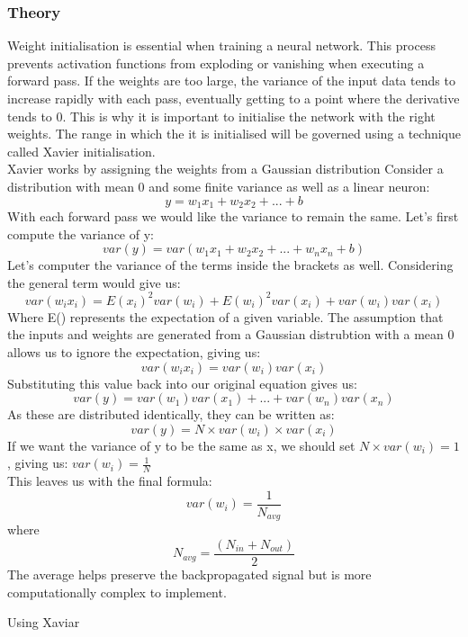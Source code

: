 \documentclass{article}
\begin{document}
\subsubsection{Theory}
Weight initialisation is essential when training a neural network. This process prevents
activation functions from exploding or vanishing when executing a forward pass. If the weights are too large, the variance of the input data tends to increase rapidly with each pass, eventually
getting to a point where the derivative tends to 0. This is why it is important to initialise the network with the right weights. The range in which the it is initialised will be governed using a technique called Xavier initialisation.\\
Xavier works by assigning the weights from a Gaussian distribution
Consider a distribution with mean 0 and some finite variance as well as a linear neuron: $$y = w_1x_1 + w_2x_2 + ... + b$$
With each forward pass we would like the variance to remain the same.
Let's first compute the variance of y:
$$var(y) = var(w_1x_1 + w_2x_2 + ...+w_nx_n + b)$$
Let's computer the variance of the terms inside the brackets as well. Considering the general term would give us:
$$var(w_ix_i) = E(x_i)^2var(w_i) + E(w_i)^2var(x_i) + var(w_i)var(x_i)$$
Where E() represents the expectation of a given variable. The assumption that the inputs and weights are generated from a Gaussian distrubtion with a mean 0 allows us to ignore the
expectation, giving us:
$$var(w_ix_i) = var(w_i)var(x_i) $$
Substituting this value back into our original equation gives us:
$$var(y) = var(w_1)var(x_1)+ ... + var(w_n)var(x_n)$$
As these are distributed identically, they can be written as:
$$var(y) = N \times var(w_i) \times var(x_i)$$
If we want the variance of y to be the same as x, we should set $N\times var(w_i) = 1$, giving us:
$var(w_i) = \frac{1}{N}$
\\This leaves us with the final formula:
$$var(w_i) = \frac{1}{N_{avg}}$$
where $$N_{avg} = \frac{(N_{in} + N_{out})}{2}$$
The average helps preserve the backpropagated signal but is more computationally complex to implement.



\begin{algorithm}
\caption{Using Xaviar}
\begin{algorithmic}[1]
    \EndFor{}
\EndWhile{}
\end{algorithmic}
\end{algorithm}
\end{document}

